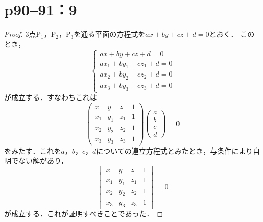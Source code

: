 \documentclass[a4paper,10pt,fleqn]{ltjsarticle}
\begin{document}
\newpage

\section*{p90--91：9}

\begin{tleftbar}
    \begin{proof}
        3点$\mathrm{P}_1$，$\mathrm{P_2}$，$\mathrm{P_3}$を通る平面の方程式を$ax+by+cz+d=0$とおく．
        このとき，
        \[
            \begin{cases}
                ax+by+cz + d =0         \\
                ax_1 + by_1 +cz_1 +d =0 \\
                ax_2 + by_2 +cz_2 +d =0 \\
                ax_3 + by_3 +cz_3 +d =0
            \end{cases}
        \]
        が成立する．すなわちこれは
        \[
            \begin{pmatrix}
                x   & y   & z   & 1 \\
                x_1 & y_1 & z_1 & 1 \\
                x_2 & y_2 & z_2 & 1 \\
                x_3 & y_3 & z_3 & 1
            \end{pmatrix}
            \begin{pmatrix}
                a \\
                b \\
                c \\
                d
            \end{pmatrix}
            = \bm{0}
        \]
        をみたす．これを$a$，$b$，$c$，$d$についての連立方程式とみたとき，与条件により自明でない解があり，
        \[
            \begin{vmatrix}
                x   & y   & z   & 1 \\
                x_1 & y_1 & z_1 & 1 \\
                x_2 & y_2 & z_2 & 1 \\
                x_3 & y_3 & z_3 & 1
            \end{vmatrix}
            =0
        \]
        が成立する．これが証明すべきことであった．
    \end{proof}
\end{tleftbar}

\newpage
\end{document}

